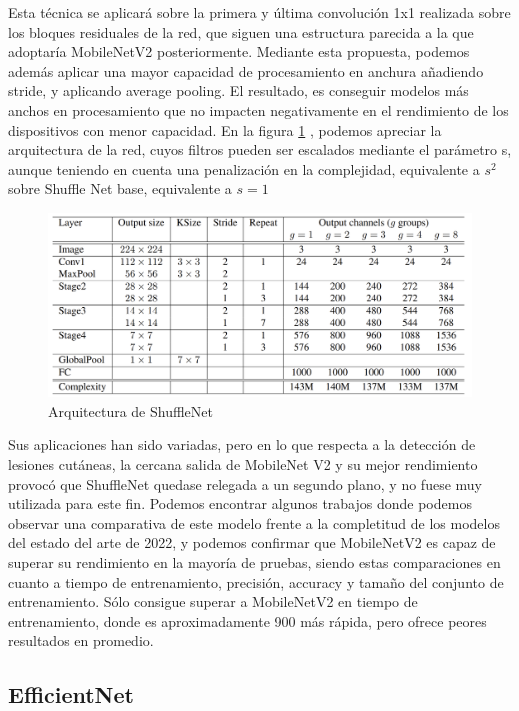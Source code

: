 Esta técnica se aplicará sobre la primera y última convolución 1x1 realizada sobre los bloques residuales de la red, que siguen una estructura parecida a la que adoptaría MobileNetV2 posteriormente. Mediante esta propuesta, podemos además aplicar una mayor capacidad de procesamiento en anchura añadiendo stride, y aplicando average pooling. El resultado, es conseguir modelos más anchos en procesamiento que no impacten negativamente en el rendimiento de los dispositivos con menor capacidad. En la figura \ref{arquitecturashuffle} , podemos apreciar la arquitectura de la red, cuyos filtros pueden ser escalados mediante el parámetro s, aunque teniendo en cuenta una penalización en la complejidad, equivalente a $s^2$ sobre Shuffle Net base, equivalente a $s=1$

\begin{figure}[H]

		\centering
		\includegraphics[scale = 0.2]{imagenes/arquitecturashuffle.png}
		\caption{Arquitectura de ShuffleNet}
		\label{arquitecturashuffle}
	\end{figure}

Sus aplicaciones han sido variadas, pero en lo que respecta a la detección de lesiones cutáneas, la cercana salida de MobileNet V2 y su mejor rendimiento provocó que ShuffleNet quedase relegada a un segundo plano, y no fuese muy utilizada para este fin. Podemos encontrar algunos trabajos \cite{shuffleapp} donde podemos observar una comparativa de este modelo frente a la completitud de los modelos del estado del arte de 2022, y podemos confirmar que  MobileNetV2 es capaz de superar su rendimiento en la mayoría de pruebas, siendo estas comparaciones en cuanto a tiempo de entrenamiento, precisión, accuracy y tamaño del conjunto de entrenamiento. Sólo consigue superar a MobileNetV2 en tiempo de entrenamiento, donde es aproximadamente 900 más rápida, pero ofrece peores resultados en promedio.

\subsection{EfficientNet}
\label{efnetcap}

